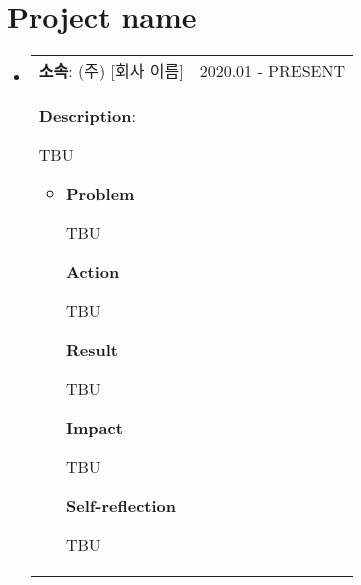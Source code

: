 \documentclass[letterpaper,11pt]{article}
\makeatletter
\newcommand{\resumeProject}[3]{
  \vspace{0pt}\item
    \begin{tabular*}{0.97\textwidth}[t]{l@{\extracolsep{\fill}}r}
      #1 & \small #2 \\
      {#3}
    \end{tabular*}\vspace{-5pt}
}
\newcommand{\resumeSubProject}[2]{
  \item{
    {#1 \vspace{0pt}}
    {#2}
  }
}
\newcommand{\resumeProjectListStart}{\begin{itemize}[leftmargin=*]}
\newcommand{\resumeProjectListEnd}{\end{itemize}}
\newcommand{\resumeSubProjectListStart}{\begin{itemize}[leftmargin=*]}
\newcommand{\resumeSubProjectListEnd}{\end{itemize}}
\makeatother
\begin{document}
\section{\textbf{Project name}}
  \resumeProjectListStart
    \resumeProject
    {\textbf{소속}: (주) [회사 이름]} {2020.01 - PRESENT}
    
    {\textbf{Description}:
    
    TBU
    
    \resumeSubProjectListStart
        \resumeSubProject {\textbf{Problem}}
        
        {TBU
        
        \vspace{2mm}
        
        \textbf{Action}
        
        TBU
        
        \vspace{2mm}

        \textbf{Result}
        
        TBU
        
        \vspace{2mm}
        
        \textbf{Impact}
        
        TBU

        \vspace{2mm}

        \textbf{Self-reflection}
        
        TBU

        \vspace{2mm}
        
        }
    \resumeSubProjectListEnd
    }
  \resumeProjectListEnd
\end{document}
